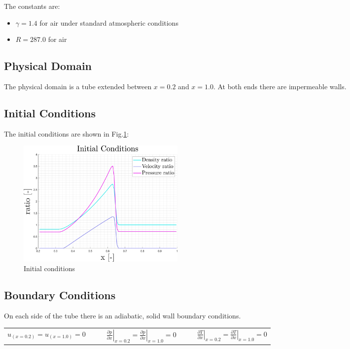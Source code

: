 \documentclass[11pt, a4paper]{article}
\begin{document}
The constants are:
\begin{itemize}
    \item $\gamma=1.4$ for air under standard atmospheric conditions
    \item $R=287.0$ for air
\end{itemize}

\subsection{Physical Domain}
The physical domain is a tube extended between $x=0.2$ and $x=1.0$. At both ends there are impermeable walls.

\subsection{Initial Conditions}
The initial conditions are shown in Fig.\ref{fig: initial conditions}:
\begin{figure}[H]
    \centering
    \includegraphics[width=0.4\textwidth]{images/Initial Conditions.png}
    \caption{Initial conditions}
    \label{fig: initial conditions}
\end{figure}

\subsection{Boundary Conditions}
On each side of the tube there is an adiabatic, solid wall boundary conditions. 
\begin{table}[H]
    \centering
    \begin{tabular}{cc||ccc||cc}
        $u_{\left(x=0.2\right)}=u_{\left(x=1.0\right)}=0$ &&& $\displaystyle\left.\frac{\partial p}{\partial x}\right|_{x=0.2}=\left.\frac{\partial p}{\partial x}\right|_{x=1.0}=0$ &&& $\displaystyle\left.\frac{\partial T}{\partial x}\right|_{x=0.2}=\left.\frac{\partial T}{\partial x}\right|_{x=1.0}=0$
    \end{tabular}
\end{table}
\end{document}
